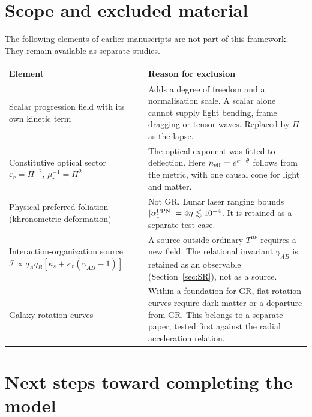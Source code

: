 \documentclass[11pt]{article}
\newcommand{\Pg}{\Pi}                 %
\newcommand{\thP}{\theta}             %
\newcommand{\sgP}{\sigma}             %
\theoremstyle{plain}
\theoremstyle{definition}
\theoremstyle{remark}
\begin{document}
\section{Scope and excluded material}
\label{sec:scope}

The following elements of earlier manuscripts are not part of this framework. They remain available as separate studies.

\begin{longtable}{@{}>{\raggedright\arraybackslash}p{}>{\raggedright\arraybackslash}p{}@{}}
\toprule
Element & Reason for exclusion \\
\midrule
Scalar progression field with its own kinetic term~\cite{JordanLoading} & Adds a degree of freedom and a normalisation scale. A scalar alone cannot supply light bending, frame dragging or tensor waves. Replaced by $\Pg$ as the lapse. \\
Constitutive optical sector $\varepsilon_r=\Pg^{-2}$, $\mu_r^{-1}=\Pg^{2}$~\cite{JordanOptics} & The optical exponent was fitted to deflection. Here $n_{\rm eff}=e^{\sgP-\thP}$ follows from the metric, with one causal cone for light and matter. \\
Physical preferred foliation (khronometric deformation)~\cite{JordanGeometry} & Not GR. Lunar laser ranging bounds $|\alpha_1^{\rm PPN}|=4\eta\lesssim10^{-4}$. It is retained as a separate test case. \\
Interaction-organization source $\mathcal I\propto q_Aq_B[\kappa_s+\kappa_r(\gamma_{AB}-1)]$~\cite{JordanComplexity} & A source outside ordinary $T^{\mu\nu}$ requires a new field. The relational invariant $\gamma_{AB}$ is retained as an observable (Section~\ref{sec:SR}), not as a source. \\
Galaxy rotation curves & Within a foundation for GR, flat rotation curves require dark matter or a departure from GR. This belongs to a separate paper, tested first against the radial acceleration relation. \\
\bottomrule
\end{longtable}

\section{Next steps toward completing the model}
\label{sec:next}
\end{document}
